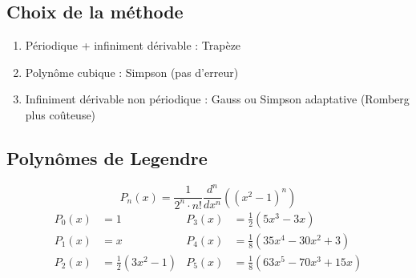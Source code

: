 \documentclass[resume]{subfiles}
\begin{document}
	\subsection{Choix de la méthode}
	\begin{enumerate}
	\item Périodique + infiniment dérivable : Trapèze
	\item Polynôme cubique : Simpson (pas d'erreur)
	\item Infiniment dérivable non périodique : Gauss ou Simpson adaptative (Romberg plus coûteuse)
	\end{enumerate}  
	\subsection{Polynômes de Legendre}
	$$P_n(x)=\frac{1}{2^n\cdot n!}\frac{d^n}{dx^n}\left((x^2-1)^n\right)$$
	\begin{align*}
	P_0(x)&=1& P_3(x)&=\frac{1}{2}(5x^3-3x)\\
	P_1(x)&=x & P_4(x)&=\frac{1}{8}(35x^4-30x^2+3) \\
	P_2(x)&=\frac{1}{2}(3x^2-1)& P_5(x)&=\frac{1}{8}(63x^5-70x^3+15x)
	\end{align*}
\end{document}
